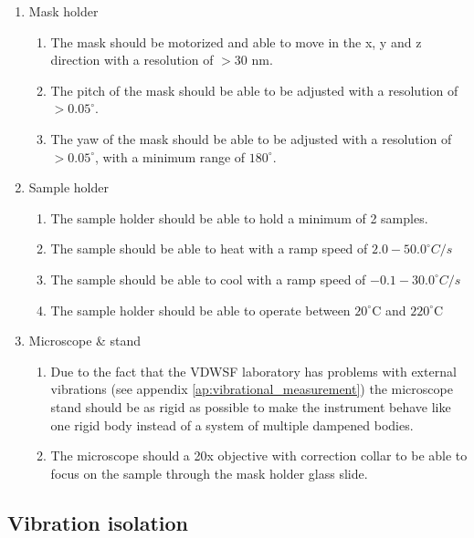 \documentclass[10pt]{article}
\begin{document}
\begin{enumerate}[noitemsep]
  \item Mask holder
  \begin{enumerate}[noitemsep]
    \item The mask should be motorized and able to move in the x, y and z direction with a resolution of $>30$ nm.
    \item The pitch of the mask should be able to be adjusted with a resolution of $>0.05^{\circ}$.
    \item The yaw of the mask should be able to be adjusted with a resolution of $>0.05^{\circ}$, with a minimum range of $180^{\circ}$.
  \end{enumerate}
  \item Sample holder
  \begin{enumerate}[noitemsep]
    \item The sample holder should be able to hold a minimum of 2 samples.
    \item The sample should be able to heat with a ramp speed of $2.0 - 50.0^{\circ} C/s$
    \item The sample should be able to cool with a ramp speed of $-0.1 - 30.0^{\circ} C/s$ 
    \item The sample holder should be able to operate between $20^\circ$C and $220^\circ$C
  \end{enumerate}
  \item Microscope \& stand
  \begin{enumerate}[noitemsep]
    \item Due to the fact that the VDWSF laboratory has problems with external vibrations (see appendix \ref{ap:vibrational_measurement}) the microscope stand should be as rigid as possible to make the instrument behave like one rigid body instead of a system of multiple dampened bodies.
    \item The microscope should a 20x objective with correction collar to be able to focus on the sample through the mask holder glass slide.
  \end{enumerate}


\end{enumerate}

\subsection{Vibration isolation}
\label{ch:vibration_isolation}
\end{document}
